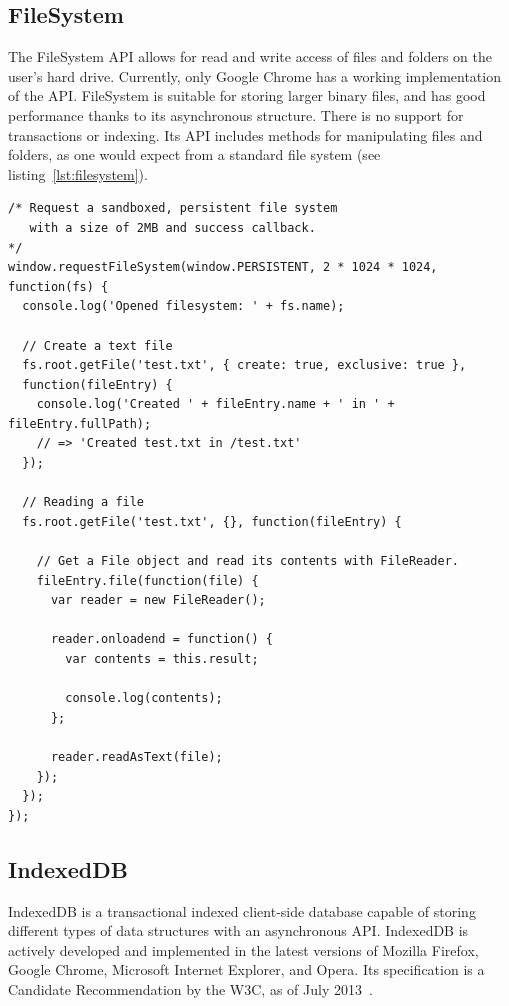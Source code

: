 \subsection{FileSystem}
\label{sec:filesystem}
The FileSystem API allows for read and write access of files and folders on the user's hard drive. Currently, only Google Chrome has a working implementation of the API. FileSystem is suitable for storing larger binary files, and has good performance thanks to its asynchronous structure. There is no support for transactions or indexing. Its API includes methods for manipulating files and folders, as one would expect from a standard file system (see listing~\ref{lst:filesystem}).

\begin{Code}
\begin{lstlisting}[caption={Use of FileSystem}, label={lst:filesystem}]
/* Request a sandboxed, persistent file system
   with a size of 2MB and success callback.
*/
window.requestFileSystem(window.PERSISTENT, 2 * 1024 * 1024, function(fs) {
  console.log('Opened filesystem: ' + fs.name);

  // Create a text file
  fs.root.getFile('test.txt', { create: true, exclusive: true },
  function(fileEntry) {
    console.log('Created ' + fileEntry.name + ' in ' + fileEntry.fullPath);
    // => 'Created test.txt in /test.txt'
  });

  // Reading a file
  fs.root.getFile('test.txt', {}, function(fileEntry) {

    // Get a File object and read its contents with FileReader.
    fileEntry.file(function(file) {
      var reader = new FileReader();

      reader.onloadend = function() {
        var contents = this.result;

        console.log(contents);
      };

      reader.readAsText(file);
    });
  });
});
\end{lstlisting}
\end{Code}

\subsection{IndexedDB}
\label{sec:indexeddb}
IndexedDB is a transactional indexed client-side database capable of storing different types of data structures with an asynchronous API. IndexedDB is actively developed and implemented in the latest versions of Mozilla Firefox, Google Chrome, Microsoft Internet Explorer, and Opera. Its specification is a Candidate Recommendation by the W3C, as of July 2013~\cite{IndexedDB:Online}.

